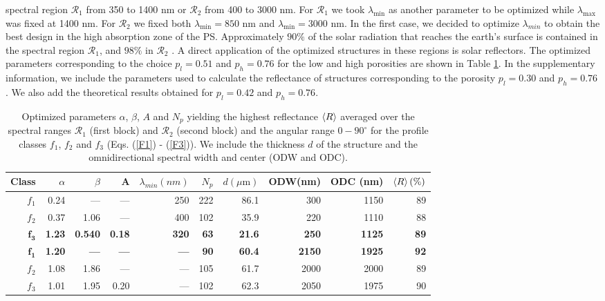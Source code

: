 \documentclass[a4paper,fleqn]{cas-sc}
\begin{document}
spectral region $\mathcal R_1$ from 350 to
1400 nm or $\mathcal R_2$ from 400 to 3000 nm. For $\mathcal R_1$ we took
$\lambda_{\min}$ as another parameter to be optimized while $\lambda_{\max}$
was fixed at 1400 nm. For $\mathcal R_2$ we fixed both
$\lambda_{\min}=850$ nm and $\lambda_{\min}=3000$ nm.
In the first case, we decided to optimize $\lambda_{min}$ to
obtain the best design in the high absorption zone of the PS.
Approximately $90\%$ of the solar radiation that reaches the
earth's surface is contained in the spectral region
$\mathcal R_1$, and $98\%$ in $\mathcal R_2$ \cite{Bird1983}.
A direct
application of the optimized structures in these regions is solar
reflectors. The
optimized parameters corresponding to the choice $p_l=0.51$ and
$p_h=0.76$ for the low and high porosities
are shown in Table \ref{tab:tableA}. In the supplementary
information, we include the parameters used to calculate the
reflectance of structures corresponding to the porosity $p_l=0.30$
and $p_h=0.76$. We also add the theoretical results obtained for
$p_l=0.42$ and $p_h=0.76$.

\begin{table}
        \centering
        \label{tab:tableA}
        \addtolength{\tabcolsep}{-2pt}
        \begin{tabular}{rrrrrrrrrr}
                Class&$\alpha$&$\beta$&A&$\lambda_{min}(nm)$&$N_{p}$&$d(\mu\text{m})$       &ODW(nm)&ODC (nm)&$\braket{R}(\%)$\\
                \hline
                \hline
                $f_{1}$     &0.24    &---      &---     &250&222   &86.1    &300    &1150    &89\\
                $f_{2}$     &0.37    &1.06     &---     &400&102   &35.9    &220    &1110    &88\\
                $\bm{f_{3}}$&\bf 1.23&\bf 0.540&\bf 0.18&\bf 320&\bf 63&\bf 21.6&\bf 250&\bf 1125&\bf 89\\
                \hline
                $\bm{f_{1}}$&\bf 1.20&\bf ---  &\bf --- &\bf ---&\bf 90&\bf 60.4&\bf 2150&\bf 1925&\bf 92\\
                $f_{2}$     &1.08    &1.86     &---  &---  &105   &61.7    &2000    &2000    &89\\
                $f_{3}$     &1.01    &1.95     &0.20  &---  &102   &62.3    &2050    &1975    &90\\
        \end{tabular}
        \caption{Optimized parameters $\alpha$, $\beta$, $A$ and $N_p$ yielding the highest
                reflectance $\braket{R}$ averaged over the spectral ranges
                $\mathcal R_1$ (first block) and $\mathcal R_2$ (second block) and
                the angular range $0-90^\circ$ for the profile classes $f_1$, $f_2$ and
                $f_3$ (Eqs. (\ref{F1}) - (\ref{F3})). We include the thickness $d$
                of the structure and the omnidirectional spectral
                width and center (ODW and ODC).}
\end{table}
\end{document}
